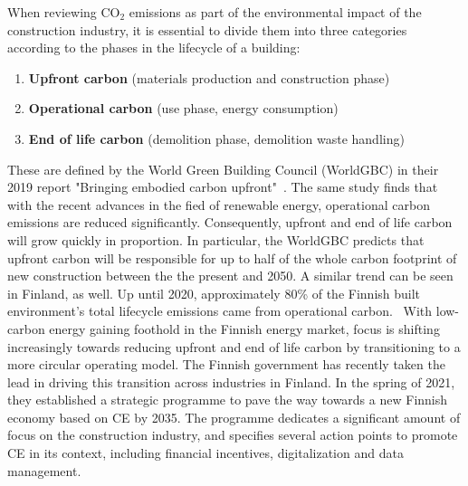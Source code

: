 \documentclass[english, 12pt, a4paper, sci, utf8, a-2b, online]{aaltothesis}
\begin{document}
When reviewing $\text{CO}_2$ emissions as part of the environmental impact of the construction industry, it is essential to divide them into three categories according to the phases
in the lifecycle of a building:
\begin{enumerate}
  \item \textbf{Upfront carbon} (materials production and construction phase)
  \item \textbf{Operational carbon} (use phase, energy consumption)
  \item \textbf{End of life carbon} (demolition phase, demolition waste handling)
\end{enumerate}
These are defined by the World Green Building Council (WorldGBC) in their 2019 report "Bringing embodied carbon upfront"~\cite{adams}. The same study finds that with the
recent advances in the fied of renewable energy, operational carbon emissions are reduced significantly. Consequently, upfront and end of life carbon will
grow quickly in proportion. In particular, the WorldGBC predicts that upfront carbon will be responsible for up to half of the whole carbon footprint of new construction between the
the present and 2050. A similar trend can be seen in Finland, as well. Up until 2020, approximately 80\% of the Finnish built environment's total lifecycle emissions came from operational
carbon.~\cite{laine} With low-carbon energy gaining foothold in the Finnish energy market, focus is shifting increasingly towards reducing upfront and end of life carbon by transitioning
to a more circular operating model. The Finnish government has recently taken the lead in driving this transition across industries in Finland. In the spring of 2021,
they established a strategic programme \cite{gov} to pave the way towards a new Finnish economy based on CE by 2035. The programme dedicates a significant amount of focus on the
construction industry, and specifies several action points to promote CE in its context, including financial incentives, digitalization and data management.
\end{document}
